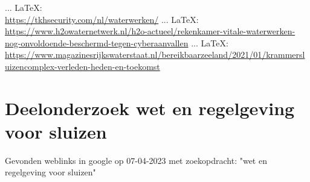 \begin{thebibliography}{99}
 ... \LaTeX:\\ \url{https://tkhsecurity.com/nl/waterwerken/}
 ... \LaTeX:\\ \url{https://www.h2owaternetwerk.nl/h2o-actueel/rekenkamer-vitale-waterwerken-nog-onvoldoende-beschermd-tegen-cyberaanvallen}
 ... \LaTeX:\\ \url{https://www.magazinesrijkswaterstaat.nl/bereikbaarzeeland/2021/01/krammersluizencomplex-verleden-heden-en-toekomst}



\chapter{Deelonderzoek wet en regelgeving voor sluizen}



Gevonden weblinks in google op 07-04-2023 met zoekopdracht: "wet en regelgeving voor sluizen"




\end{thebibliography}
